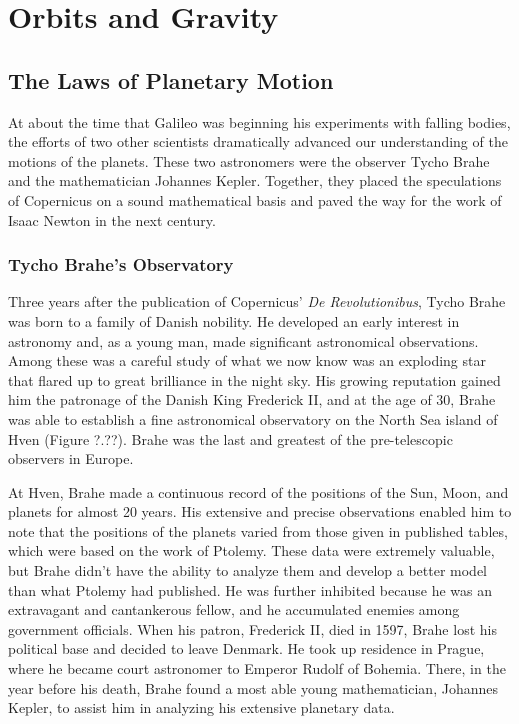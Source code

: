 \documentclass[../../main-astronomy.tex]{subfiles}
\begin{document}
\section{Orbits and Gravity}

\subsection{The Laws of Planetary Motion}

At about the time that Galileo was beginning his experiments with falling bodies, the efforts of two other scientists dramatically advanced our understanding of the motions of the planets. These two astronomers were the observer Tycho Brahe and the mathematician Johannes Kepler. Together, they placed the speculations of Copernicus on a sound mathematical basis and paved the way for the work of Isaac Newton in the next century.

\subsubsection*{Tycho Brahe's Observatory}

Three years after the publication of Copernicus' \textit{De Revolutionibus}, Tycho Brahe was born to a family of Danish nobility. He developed an early interest in astronomy and, as a young man, made significant astronomical observations. Among these was a careful study of what we now know was an exploding star that flared up to great brilliance in the night sky. His growing reputation gained him the patronage of the Danish King Frederick II, and at the age of 30, Brahe was able to establish a fine astronomical observatory on the North Sea island of Hven (Figure ?.??). Brahe was the last and greatest of the pre-telescopic observers in Europe.

\vspace{1em} %

At Hven, Brahe made a continuous record of the positions of the Sun, Moon, and planets for almost 20 years. His extensive and precise observations enabled him to note that the positions of the planets varied from those given in published tables, which were based on the work of Ptolemy. These data were extremely valuable, but Brahe didn't have the ability to analyze them and develop a better model than what Ptolemy had published. He was further inhibited because he was an extravagant and cantankerous fellow, and he accumulated enemies among government officials. When his patron, Frederick II, died in 1597, Brahe lost his political base and decided to leave Denmark. He took up residence in Prague, where he became court astronomer to Emperor Rudolf of Bohemia. There, in the year before his death, Brahe found a most able young mathematician, Johannes Kepler, to assist him in analyzing his extensive planetary data.
\end{document}
